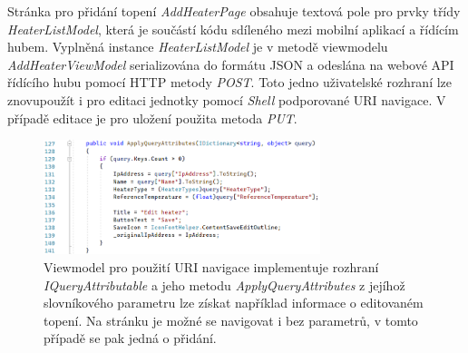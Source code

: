 Stránka pro přidání topení {\it AddHeaterPage} obsahuje textová pole pro prvky třídy {\it HeaterListModel}, která je součástí kódu sdíleného mezi mobilní aplikací a řídícím hubem. Vyplněná instance {\it HeaterListModel} je v metodě viewmodelu {\it AddHeaterViewModel} serializována do formátu JSON a odeslána na webové API řídícího hubu pomocí HTTP metody {\it POST}. Toto jedno uživatelské rozhraní lze znovupoužít i pro editaci jednotky pomocí {\it Shell} podporované URI navigace. V případě editace je pro uložení použita metoda {\it PUT}.

\begin{figure}[hbt]
\includegraphics[width=0.72\textwidth]{obrazky-figures/code-applyqueryattributes.png}
\caption{Viewmodel pro použití URI navigace implementuje rozhraní {\it IQueryAttributable} a jeho metodu {\it ApplyQueryAttributes} z jejíhož slovníkového parametru lze získat například informace o editovaném topení. Na stránku je možné se navigovat i bez parametrů, v tomto případě se pak jedná o přidání.}
\end{figure}

